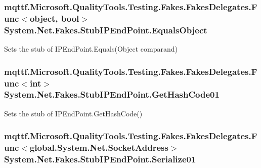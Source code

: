 \hypertarget{class_system_1_1_net_1_1_fakes_1_1_stub_i_p_end_point_ab926c3be56433fc5f247ca8067e62088}{
\subsubsection[{Equals\-Object}]{\setlength{\rightskip}{0pt plus 5cm}mqttf.\-Microsoft.\-Quality\-Tools.\-Testing.\-Fakes.\-Fakes\-Delegates.\-Func$<$object, bool$>$ System.\-Net.\-Fakes.\-Stub\-I\-P\-End\-Point.\-Equals\-Object}}\label{class_system_1_1_net_1_1_fakes_1_1_stub_i_p_end_point_ab926c3be56433fc5f247ca8067e62088}


Sets the stub of I\-P\-End\-Point.\-Equals(\-Object comparand)

\hypertarget{class_system_1_1_net_1_1_fakes_1_1_stub_i_p_end_point_a17f0f6b869f605403f4b4ff68b39dae9}{
\subsubsection[{Get\-Hash\-Code01}]{\setlength{\rightskip}{0pt plus 5cm}mqttf.\-Microsoft.\-Quality\-Tools.\-Testing.\-Fakes.\-Fakes\-Delegates.\-Func$<$int$>$ System.\-Net.\-Fakes.\-Stub\-I\-P\-End\-Point.\-Get\-Hash\-Code01}}\label{class_system_1_1_net_1_1_fakes_1_1_stub_i_p_end_point_a17f0f6b869f605403f4b4ff68b39dae9}


Sets the stub of I\-P\-End\-Point.\-Get\-Hash\-Code()

\hypertarget{class_system_1_1_net_1_1_fakes_1_1_stub_i_p_end_point_a2dfddef5bb09e76298b6def943234d0e}{
\subsubsection[{Serialize01}]{\setlength{\rightskip}{0pt plus 5cm}mqttf.\-Microsoft.\-Quality\-Tools.\-Testing.\-Fakes.\-Fakes\-Delegates.\-Func$<$global.\-System.\-Net.\-Socket\-Address$>$ System.\-Net.\-Fakes.\-Stub\-I\-P\-End\-Point.\-Serialize01}}\label{class_system_1_1_net_1_1_fakes_1_1_stub_i_p_end_point_a2dfddef5bb09e76298b6def943234d0e}


